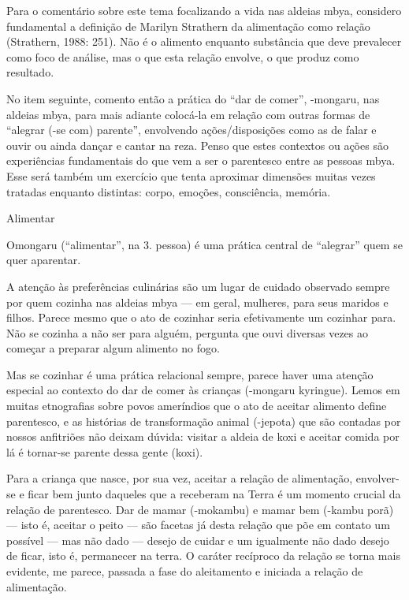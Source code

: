\documentclass{article}
\begin{document}
Para o coment\'ario sobre este tema focalizando a vida nas aldeias mbya,
considero fundamental a defini\c{c}\~ao de Marilyn Strathern da
alimenta\c{c}\~ao como rela\c{c}\~ao (Strathern, 1988: 251). N\~ao \'e
o alimento enquanto subst\^ancia que deve prevalecer como foco de
an\'alise, mas o que esta rela\c{c}\~ao envolve, o que produz como
resultado.

No item seguinte, comento ent\~ao a pr\'atica do {\textquotedblleft}dar
de comer{\textquotedblright}, -mongaru, nas aldeias mbya, para mais
adiante coloc\'a-la em rela\c{c}\~ao com outras formas de
{\textquotedblleft}alegrar (-se com) parente{\textquotedblright},
envolvendo a\c{c}\~oes/disposi\c{c}\~oes como as de falar e ouvir ou
ainda dan\c{c}ar e cantar na reza. Penso que estes contextos ou
a\c{c}\~oes s\~ao experi\^encias fundamentais do que vem a ser o
parentesco entre as pessoas mbya. Esse ser\'a tamb\'em um exerc\'icio
que tenta aproximar dimens\~oes muitas vezes tratadas enquanto
distintas: corpo, emo\c{c}\~oes, consci\^encia, mem\'oria.

Alimentar

Omongaru ({\textquotedblleft}alimentar{\textquotedblright}, na
3{\textordfeminine}. pessoa) \'e uma pr\'atica central de
{\textquotedblleft}alegrar{\textquotedblright} quem se quer aparentar.

A aten\c{c}\~ao \`as prefer\^encias culin\'arias s\~ao um lugar de
cuidado observado sempre por quem cozinha nas aldeias mbya --- em
geral, mulheres, para seus maridos e filhos.  Parece mesmo que o ato de
cozinhar seria efetivamente um cozinhar para. N\~ao se cozinha a n\~ao
ser para algu\'em, pergunta que ouvi diversas vezes ao come\c{c}ar a
preparar algum alimento no fogo. 

Mas se cozinhar \'e uma pr\'atica relacional sempre, parece haver uma
aten\c{c}\~ao especial ao contexto do dar de comer \`as crian\c{c}as
({}-mongaru kyringue). Lemos em muitas etnografias sobre povos
amer\'indios que o ato de aceitar alimento define parentesco, e as
hist\'orias de transforma\c{c}\~ao animal (-jepota) que s\~ao contadas
por nossos anfitri\~oes n\~ao deixam d\'uvida: visitar a aldeia de koxi
e aceitar comida por l\'a \'e tornar-se parente dessa gente (koxi).

Para a crian\c{c}a que nasce, por sua vez, aceitar a rela\c{c}\~ao de
alimenta\c{c}\~ao, envolver-se e ficar bem junto daqueles que a
receberam na Terra \'e um momento crucial da rela\c{c}\~ao de
parentesco. Dar de mamar (-mokambu) e mamar bem (-kambu por\~a) ---
isto \'e, aceitar o peito --- s\~ao facetas j\'a desta rela\c{c}\~ao
que p\~oe em contato um poss\'ivel --- mas n\~ao dado --- desejo de
cuidar e um igualmente n\~ao dado desejo de ficar, isto \'e, permanecer
na terra. O car\'ater rec\'iproco da rela\c{c}\~ao se torna mais
evidente, me parece, passada a fase do aleitamento e iniciada a
rela\c{c}\~ao de alimenta\c{c}\~ao.
\end{document}
